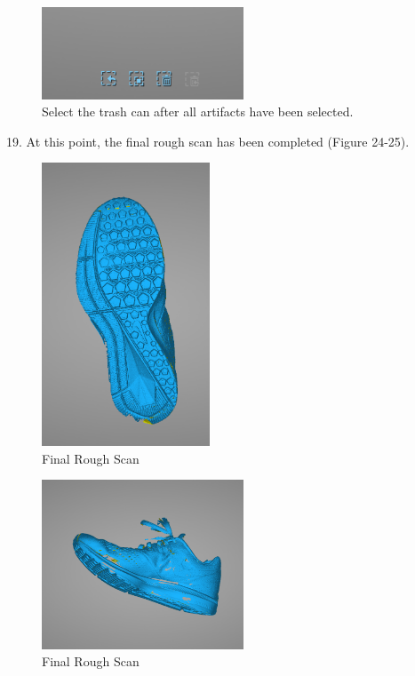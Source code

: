 \begin{figure}[!htp]
\centering
\includegraphics[width=6cm]{Second_Tool_Bar}
\caption{Select the trash can after all artifacts have been selected.}
\label{Image 23}
\end{figure}

\newpage

19. At this point, the final rough scan has been completed (Figure 24-25).

\begin{figure}[!htp]
\centering
\includegraphics[width=5cm]{Shoe}
\caption{Final Rough Scan}
\label{Image 24}
\end{figure}

\begin{figure}[!htp]
\centering
\includegraphics[width=6cm]{Shoe_Side}
\caption{Final Rough Scan}
\label{Image 25}
\end{figure}

\newpage


